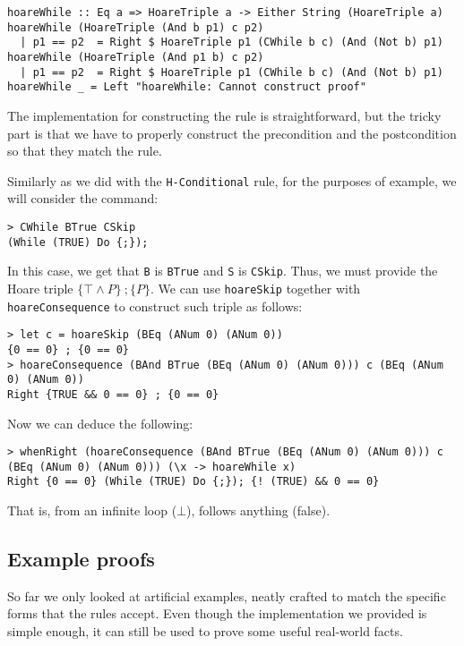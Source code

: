 \documentclass{article}
\begin{document}
\begin{lstlisting}
hoareWhile :: Eq a => HoareTriple a -> Either String (HoareTriple a)
hoareWhile (HoareTriple (And b p1) c p2)
  | p1 == p2  = Right $ HoareTriple p1 (CWhile b c) (And (Not b) p1)
hoareWhile (HoareTriple (And p1 b) c p2)
  | p1 == p2  = Right $ HoareTriple p1 (CWhile b c) (And (Not b) p1)
hoareWhile _ = Left "hoareWhile: Cannot construct proof"
\end{lstlisting}

The implementation for constructing the rule is straightforward, but the tricky part is that we have to properly construct the precondition and the postcondition so that they match the rule.

Similarly as we did with the \texttt{H-Conditional} rule, for the purposes of example, we will consider the command:

\begin{lstlisting}
> CWhile BTrue CSkip
(While (TRUE) Do {;});
\end{lstlisting}

In this case, we get that \texttt{B} is \texttt{BTrue} and \texttt{S} is \texttt{CSkip}. Thus, we must provide the Hoare triple $\{\top \land P \} \ ; \{P\}$. We can use \texttt{hoareSkip} together with \texttt{hoareConsequence} to construct such triple as follows:

\begin{lstlisting}
> let c = hoareSkip (BEq (ANum 0) (ANum 0))
{0 == 0} ; {0 == 0}
> hoareConsequence (BAnd BTrue (BEq (ANum 0) (ANum 0))) c (BEq (ANum 0) (ANum 0))
Right {TRUE && 0 == 0} ; {0 == 0}
\end{lstlisting}

Now we can deduce the following:

\begin{lstlisting}
> whenRight (hoareConsequence (BAnd BTrue (BEq (ANum 0) (ANum 0))) c (BEq (ANum 0) (ANum 0))) (\x -> hoareWhile x)
Right {0 == 0} (While (TRUE) Do {;}); {! (TRUE) && 0 == 0}
\end{lstlisting}

That is, from an infinite loop ($\bot$), follows anything (false).

\subsection{Example proofs}

So far we only looked at artificial examples, neatly crafted to match the specific forms that the rules accept. Even though the implementation we provided is simple enough, it can still be used to prove some useful real-world facts.
\end{document}
